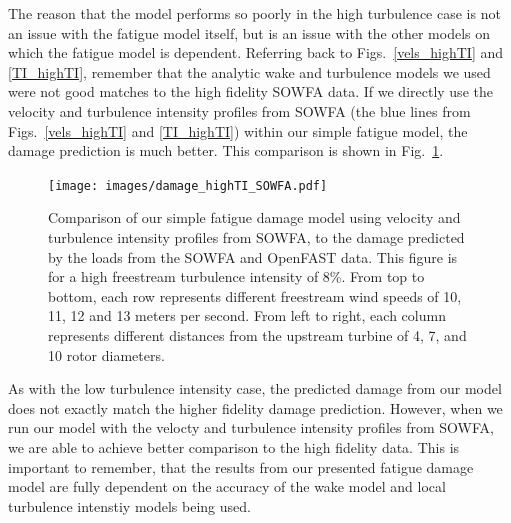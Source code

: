 \documentclass[11pt,letterpaper]{article}
\begin{document}
The reason that the model performs so poorly in the high turbulence case is not an issue with the fatigue model itself, but is an issue with the other models on which the fatigue model is dependent. Referring back to Figs.~\ref{vels_highTI} and \ref{TI_highTI}, remember that the analytic wake and turbulence models we used were not good matches to the high fidelity SOWFA data. If we directly use the velocity and turbulence intensity profiles from SOWFA (the blue lines from Figs.~\ref{vels_highTI} and \ref{TI_highTI}) within our simple fatigue model, the damage prediction is much better. This comparison is shown in Fig.~\ref{SOWFA_damage}.
% 
\begin{figure}
    \centering
    \texttt{[image: images/damage\_highTI\_SOWFA.pdf]}
    \caption{Comparison of our simple fatigue damage model using velocity and turbulence intensity profiles from SOWFA, to the damage predicted by the loads from the SOWFA and OpenFAST data. This figure is for a high freestream turbulence intensity of 8\%. From top to bottom, each row represents different freestream wind speeds of 10, 11, 12 and 13 meters per second. From left to right, each column represents different distances from the upstream turbine of 4, 7, and 10 rotor diameters.}
    \label{SOWFA_damage}
\end{figure}
% 
As with the low turbulence intensity case, the predicted damage from our model does not exactly match the higher fidelity damage prediction. However, when we run our model with the velocty and turbulence intensity profiles from SOWFA, we are able to achieve better comparison to the high fidelity data. This is important to remember, that the results from our presented fatigue damage model are fully dependent on the accuracy of the wake model and local turbulence intenstiy models being used.
\end{document}
